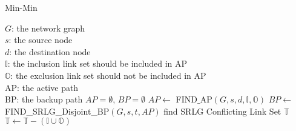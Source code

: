 \begin{algorithm}
\small{
\caption{Min-Min}
\begin{algorithmic}[1]
\label{alg:min-min}
\REQUIRE
$G$: the network graph\\
$s$: the source node\\
$d$: the destination node \\
$\mathbb{I}$:   the inclusion link set should be included in AP\\
$\mathbb{O}$: the exclusion link set should not be included in AP\\
\ENSURE
AP: the active path\\
BP: the backup path
\STATE $AP=\emptyset$, $BP=\emptyset$
\STATE $AP\leftarrow$ FIND$\_$AP$(G,s,d,\mathbb{I},\mathbb{O})$\label{alg:findap}
    \RETURN $BP\leftarrow$ FIND\_SRLG\_Disjoint\_BP$(G,s,t,AP)$\label{alg:findsrlgdisjointbp}
        \label{alg:returnpathpair}
    \ELSE
        \STATE find SRLG Conflicting Link Set $\mathbb{T}$\label{alg:findsrlgconflictinglinkset}
        \STATE $\mathbb{T}\leftarrow \mathbb{T}-(\mathbb{I}\cup\mathbb{O})$
        \label{alg:dividedandconquer}
        \label{alg:findfeasible}
        \ENDIF

    \ENDIF
\ENDIF
\end{algorithmic}
}
\end{algorithm}

